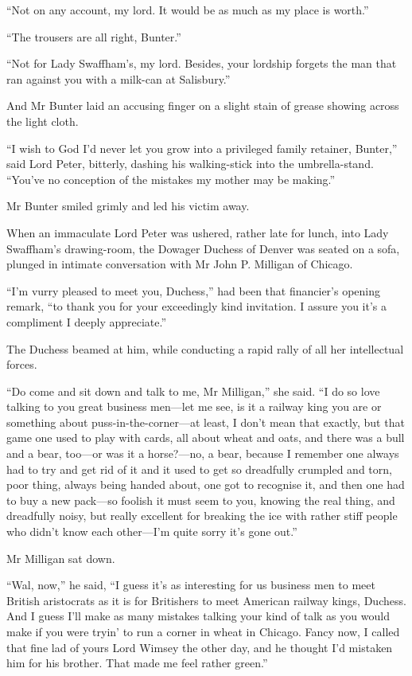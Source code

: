 \enquote{Not on any account, my lord. It would be as much as my place is worth.}

\enquote{The trousers are all right, Bunter.}

\enquote{Not for Lady Swaffham’s, my lord. Besides, your lordship forgets the man that ran against you with a milk-can at Salisbury.}

And Mr Bunter laid an accusing finger on a slight stain of grease showing across the light cloth.

\enquote{I wish to God I’d never let you grow into a privileged family retainer, Bunter,} said Lord Peter, bitterly, dashing his walking-stick into the umbrella-stand. \enquote{You’ve no conception of the mistakes my mother may be making.}

Mr Bunter smiled grimly and led his victim away.

When an immaculate Lord Peter was ushered, rather late for lunch, into Lady Swaffham’s drawing-room, the Dowager Duchess of Denver was seated on a sofa, plunged in intimate conversation with Mr John P. Milligan of Chicago.

\enquote{I’m vurry pleased to meet you, Duchess,} had been that financier’s opening remark, \enquote{to thank you for your exceedingly kind invitation. I assure you it’s a compliment I deeply appreciate.}

The Duchess beamed at him, while conducting a rapid rally of all her intellectual forces.

\enquote{Do come and sit down and talk to me, Mr Milligan,} she said. \enquote{I do so love talking to you great business men\allowbreak---\allowbreak let me see, is it a railway king you are or something about puss-in-the-corner\allowbreak---\allowbreak at least, I don’t mean that exactly, but that game one used to play with cards, all about wheat and oats, and there was a bull and a bear, too\allowbreak---\allowbreak or was it a horse?---no, a bear, because I remember one always had to try and get rid of it and it used to get so dreadfully crumpled and torn, poor thing, always being handed about, one got to recognise it, and then one had to buy a new pack\allowbreak---\allowbreak so foolish it must seem to you, knowing the real thing, and dreadfully noisy, but really excellent for breaking the ice with rather stiff people who didn’t know each other\allowbreak---\allowbreak I’m quite sorry it’s gone out.}

Mr Milligan sat down.

\enquote{Wal, now,} he said, \enquote{I guess it’s as interesting for us business men to meet British aristocrats as it is for Britishers to meet American railway kings, Duchess. And I guess I’ll make as many mistakes talking your kind of talk as you would make if you were tryin’ to run a corner in wheat in Chicago. Fancy now, I called that fine lad of yours Lord Wimsey the other day, and he thought I’d mistaken him for his brother. That made me feel rather green.}

